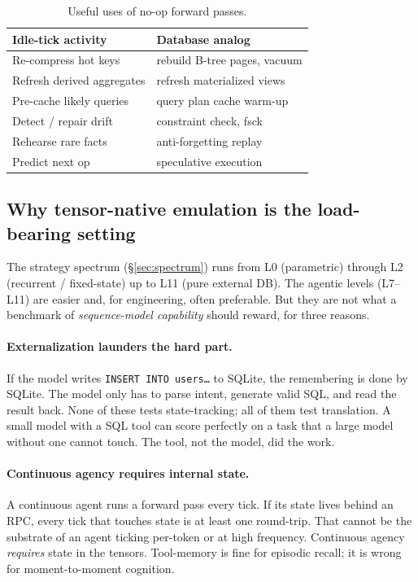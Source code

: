 \documentclass[11pt]{article}
\begin{document}
\begin{table}[h]
\centering
\small
\begin{tabularx}{\linewidth}{@{}Y Y@{}}
\toprule
Idle-tick activity         & Database analog                       \\
\midrule
Re-compress hot keys       & rebuild B-tree pages, vacuum          \\
Refresh derived aggregates & refresh materialized views            \\
Pre-cache likely queries   & query plan cache warm-up              \\
Detect / repair drift      & constraint check, fsck                \\
Rehearse rare facts        & anti-forgetting replay                \\
Predict next op            & speculative execution                 \\
\bottomrule
\end{tabularx}
\caption{Useful uses of no-op forward passes.}
\end{table}

\subsection{Why tensor-native emulation is the load-bearing setting}

The strategy spectrum (\S\ref{sec:spectrum}) runs from L0 (parametric)
through L2 (recurrent / fixed-state) up to L11 (pure external DB). The
agentic levels (L7--L11) are easier and, for engineering, often
preferable. But they are not what a benchmark of \emph{sequence-model
capability} should reward, for three reasons.

\paragraph{Externalization launders the hard part.}
If the model writes \texttt{INSERT INTO users\ldots} to SQLite, the
remembering is done by SQLite. The model only has to parse intent,
generate valid SQL, and read the result back. None of these tests
state-tracking; all of them test translation. A small model with a SQL
tool can score perfectly on a task that a large model without one
cannot touch. The tool, not the model, did the work.

\paragraph{Continuous agency requires internal state.}
A continuous agent runs a forward pass every tick. If its state lives
behind an RPC, every tick that touches state is at least one round-trip.
That cannot be the substrate of an agent ticking per-token or at high
frequency. Continuous agency \emph{requires} state in the tensors.
Tool-memory is fine for episodic recall; it is wrong for moment-to-moment
cognition.
\end{document}

